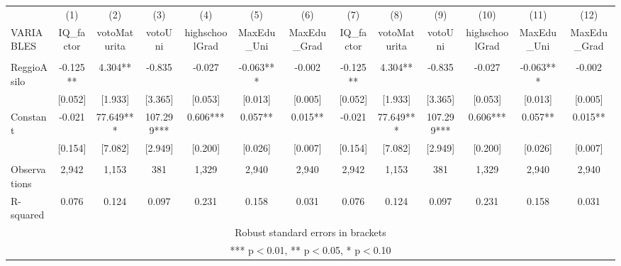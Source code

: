 \begin{tabular}{lcccccccccccc} \hline
 & (1) & (2) & (3) & (4) & (5) & (6) & (7) & (8) & (9) & (10) & (11) & (12) \\
VARIABLES & IQ\_factor & votoMaturita & votoUni & highschoolGrad & MaxEdu\_Uni & MaxEdu\_Grad & IQ\_factor & votoMaturita & votoUni & highschoolGrad & MaxEdu\_Uni & MaxEdu\_Grad \\ \hline
 &  &  &  &  &  &  &  &  &  &  &  &  \\
ReggioAsilo & -0.125** & 4.304** & -0.835 & -0.027 & -0.063*** & -0.002 & -0.125** & 4.304** & -0.835 & -0.027 & -0.063*** & -0.002 \\
 & [0.052] & [1.933] & [3.365] & [0.053] & [0.013] & [0.005] & [0.052] & [1.933] & [3.365] & [0.053] & [0.013] & [0.005] \\
Constant & -0.021 & 77.649*** & 107.299*** & 0.606*** & 0.057** & 0.015** & -0.021 & 77.649*** & 107.299*** & 0.606*** & 0.057** & 0.015** \\
 & [0.154] & [7.082] & [2.949] & [0.200] & [0.026] & [0.007] & [0.154] & [7.082] & [2.949] & [0.200] & [0.026] & [0.007] \\
 &  &  &  &  &  &  &  &  &  &  &  &  \\
Observations & 2,942 & 1,153 & 381 & 1,329 & 2,940 & 2,940 & 2,942 & 1,153 & 381 & 1,329 & 2,940 & 2,940 \\
 R-squared & 0.076 & 0.124 & 0.097 & 0.231 & 0.158 & 0.031 & 0.076 & 0.124 & 0.097 & 0.231 & 0.158 & 0.031 \\ \hline
\multicolumn{13}{c}{ Robust standard errors in brackets} \\
\multicolumn{13}{c}{ *** p$<$0.01, ** p$<$0.05, * p$<$0.10} \\
\end{tabular}
